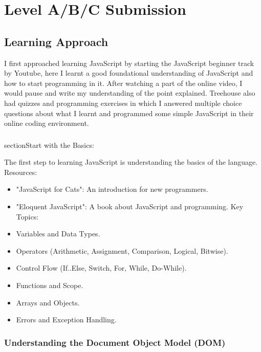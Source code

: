 \documentclass{article}
\begin{document}
\section{Level A/B/C Submission}

\subsection{Learning Approach}

I first approached learning JavaScript by  starting  the  JavaScript  beginner  track  by Youtube, here I learnt a good foundational understanding of JavaScript and how to start programming in it. After watching a part of the online video, I would pause and write my understanding of the  point  explained.  Treehouse also had  quizzes  and programming exercises in which I answered multiple choice questions about what I learnt and programmed some simple JavaScript in their online coding environment.

\subsubsection{}section{Start with the Basics:}

The first step to learning JavaScript is understanding the basics of the language.
Resources:
\begin{itemize}
\item	"JavaScript for Cats": An introduction for new programmers.
\item	"Eloquent JavaScript": A book about JavaScript and programming.
Key Topics:
\item	Variables and Data Types.
\item	Operators (Arithmetic, Assignment, Comparison, Logical, Bitwise).
\item	Control Flow (If..Else, Switch, For, While, Do-While).
\item	Functions and Scope.
\item	Arrays and Objects.
\item	Errors and Exception Handling.
\end{itemize}

\subsubsection{Understanding the Document Object Model (DOM)}
\end{document}
